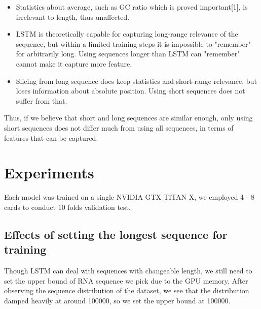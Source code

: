 \documentclass[10pt,a4paper]{article}
\begin{document}
\begin{spacing}{1.5}
		\begin{itemize}
			
			\item Statistics about average, such as GC ratio which is proved important[1], is irrelevant to length, thus unaffected.
			
			\item LSTM is theoretically capable for capturing long-range relevance of the sequence, but within a limited training steps it is impossible to "remember" for arbitrarily long. Using sequences longer than LSTM can "remember" cannot make it capture more feature.
			
			\item Slicing from long sequence does keep statistics and short-range relevance, but loses information about absolute position. Using short sequences does not suffer from that.
			
		\end{itemize}
		
		Thus, if we believe that short and long sequences are similar enough, only using short sequences does not differ much from using all sequences, in terms of features that can be captured.
		
		\section{Experiments}
		
		Each model was trained on a single NVIDIA GTX TITAN X, we employed 4 - 8 cards to conduct 10 folds validation test.
		
		\subsection{Effects of setting the longest sequence for training}
		Though LSTM can deal with sequences with changeable length, we still need to set the upper bound of RNA sequence we pick due to the GPU memory. After observing the sequence distribution of the dataset, we see that the distribution damped heavily at around 100000, so we set the upper bound at 100000.
		

\end{spacing}
\end{document}
